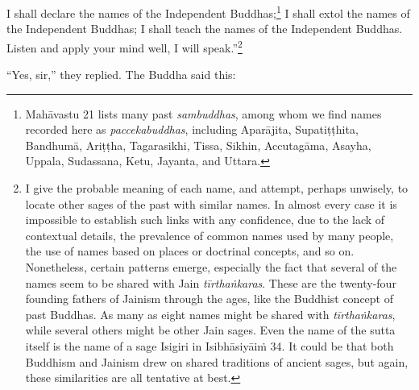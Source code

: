 \documentclass[12pt,openany]{book}%
\begin{document}
I shall declare the names of the Independent Buddhas;\footnote{\textsanskrit{Mahāvastu} 21 lists many past \textit{sambuddhas}, among whom we find names recorded here as \textit{paccekabuddhas}, including \textsanskrit{Aparājita}, \textsanskrit{Supatiṭṭhita}, \textsanskrit{Bandhumā}, \textsanskrit{Ariṭṭha}, Tagarasikhi, Tissa, Sikhin, \textsanskrit{Accutagāma}, Asayha, Uppala, Sudassana, Ketu, Jayanta, and Uttara. } I shall extol the names of the Independent Buddhas; I shall teach the names of the Independent Buddhas. Listen and apply your mind well, I will speak.”\footnote{I give the probable meaning of each name, and attempt, perhaps unwisely, to locate other sages of the past with similar names. In almost every case it is impossible to establish such links with any confidence, due to the lack of contextual details, the prevalence of common names used by many people, the use of names based on places or doctrinal concepts, and so on. Nonetheless, certain patterns emerge, especially the fact that several of the names seem to be shared with Jain \textit{\textsanskrit{tīrthaṅkaras}}. These are the  twenty-four founding fathers of Jainism through the ages, like the Buddhist concept of past Buddhas. As many as eight names might be shared with \textit{\textsanskrit{tīrthaṅkaras}}, while several others might be other Jain sages. Even the name of the sutta itself is the name of a sage Isigiri in \textsanskrit{Isibhāsiyāiṁ} 34. It could be that both Buddhism and Jainism drew on shared traditions of ancient sages, but again, these similarities are all tentative at best. } 

“Yes, sir,” they replied. The Buddha said this: 
\end{document}
